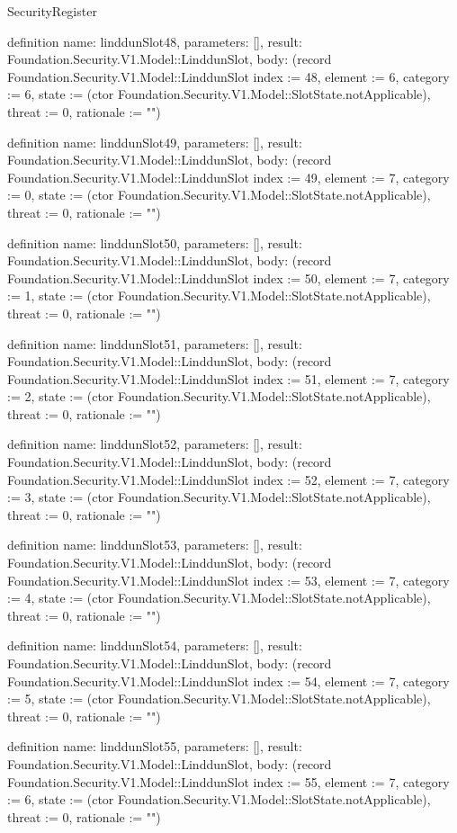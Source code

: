 \begin{lexlean}{SecurityRegister}
\begin{semanticmodule}
definition{
  name: linddunSlot48,
  parameters: [],
  result: Foundation.Security.V1.Model::LinddunSlot,
  body: (record Foundation.Security.V1.Model::LinddunSlot {index := 48, element := 6, category := 6, state := (ctor Foundation.Security.V1.Model::SlotState.notApplicable), threat := 0, rationale := ""})
}

definition{
  name: linddunSlot49,
  parameters: [],
  result: Foundation.Security.V1.Model::LinddunSlot,
  body: (record Foundation.Security.V1.Model::LinddunSlot {index := 49, element := 7, category := 0, state := (ctor Foundation.Security.V1.Model::SlotState.notApplicable), threat := 0, rationale := ""})
}

definition{
  name: linddunSlot50,
  parameters: [],
  result: Foundation.Security.V1.Model::LinddunSlot,
  body: (record Foundation.Security.V1.Model::LinddunSlot {index := 50, element := 7, category := 1, state := (ctor Foundation.Security.V1.Model::SlotState.notApplicable), threat := 0, rationale := ""})
}

definition{
  name: linddunSlot51,
  parameters: [],
  result: Foundation.Security.V1.Model::LinddunSlot,
  body: (record Foundation.Security.V1.Model::LinddunSlot {index := 51, element := 7, category := 2, state := (ctor Foundation.Security.V1.Model::SlotState.notApplicable), threat := 0, rationale := ""})
}

definition{
  name: linddunSlot52,
  parameters: [],
  result: Foundation.Security.V1.Model::LinddunSlot,
  body: (record Foundation.Security.V1.Model::LinddunSlot {index := 52, element := 7, category := 3, state := (ctor Foundation.Security.V1.Model::SlotState.notApplicable), threat := 0, rationale := ""})
}

definition{
  name: linddunSlot53,
  parameters: [],
  result: Foundation.Security.V1.Model::LinddunSlot,
  body: (record Foundation.Security.V1.Model::LinddunSlot {index := 53, element := 7, category := 4, state := (ctor Foundation.Security.V1.Model::SlotState.notApplicable), threat := 0, rationale := ""})
}

definition{
  name: linddunSlot54,
  parameters: [],
  result: Foundation.Security.V1.Model::LinddunSlot,
  body: (record Foundation.Security.V1.Model::LinddunSlot {index := 54, element := 7, category := 5, state := (ctor Foundation.Security.V1.Model::SlotState.notApplicable), threat := 0, rationale := ""})
}

definition{
  name: linddunSlot55,
  parameters: [],
  result: Foundation.Security.V1.Model::LinddunSlot,
  body: (record Foundation.Security.V1.Model::LinddunSlot {index := 55, element := 7, category := 6, state := (ctor Foundation.Security.V1.Model::SlotState.notApplicable), threat := 0, rationale := ""})
}


\end{semanticmodule}
\end{lexlean}
